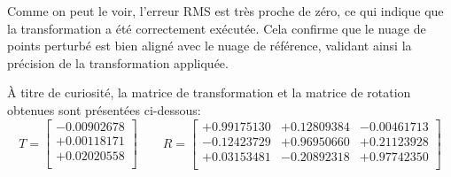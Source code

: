 \documentclass[../5RO17_TP4.tex]{subfiles}
\begin{document}
\noindent Comme on peut le voir, l'erreur RMS est très proche de zéro, ce qui indique que la transformation a été correctement exécutée. Cela confirme que le nuage de points perturbé est bien aligné avec le nuage de référence, validant ainsi la précision de la transformation appliquée.

\begin{remark}
    À titre de curiosité, la matrice de transformation et la matrice de rotation obtenues sont présentées ci-dessous:
    \begin{equation}
        T = \begin{bmatrix}
            -0.00902678\\
            +0.00118171\\
            +0.02020558\\
        \end{bmatrix}
        \qquad
        R = \begin{bmatrix}
            +0.99175130 & +0.12809384 & -0.00461713\\
            -0.12423729 & +0.96950660 & +0.21123928\\
            +0.03153481 & -0.20892318 & +0.97742350\\
        \end{bmatrix}
    \end{equation}
\end{remark}
\end{document}

